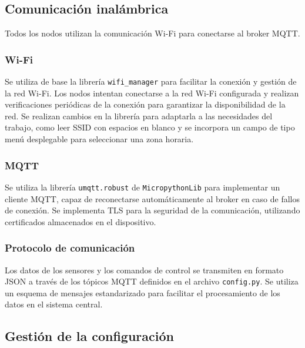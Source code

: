 \subsection{Comunicación inalámbrica}

Todos los nodos utilizan la comunicación Wi-Fi para conectarse al broker MQTT.

\subsubsection{Wi-Fi}

Se utiliza de base la librería \texttt{wifi\_manager}
\cite{MicroPythonWifiManager} para facilitar la conexión y gestión de la red
Wi-Fi. Los nodos intentan conectarse a la red Wi-Fi configurada y realizan
verificaciones periódicas de la conexión para garantizar la disponibilidad de
la red. Se realizan cambios en la librería para adaptarla a las necesidades del
trabajo, como leer SSID con espacios en blanco y se incorpora un campo de tipo
menú desplegable para seleccionar una zona horaria.

\subsubsection{MQTT}

Se utiliza la librería \texttt{umqtt.robust} de \texttt{MicropythonLib}
\cite{MicropythonLib} para implementar un cliente MQTT, capaz de reconectarse
automáticamente al broker en caso de fallos de conexión. Se implementa TLS para
la seguridad de la comunicación, utilizando certificados almacenados en el
dispositivo.

\subsubsection{Protocolo de comunicación}

Los datos de los sensores y los comandos de control se transmiten en formato
JSON a través de los tópicos MQTT definidos en el archivo \texttt{config.py}.
Se utiliza un esquema de mensajes estandarizado para facilitar el procesamiento
de los datos en el sistema central.


\subsection{Gestión de la configuración}

